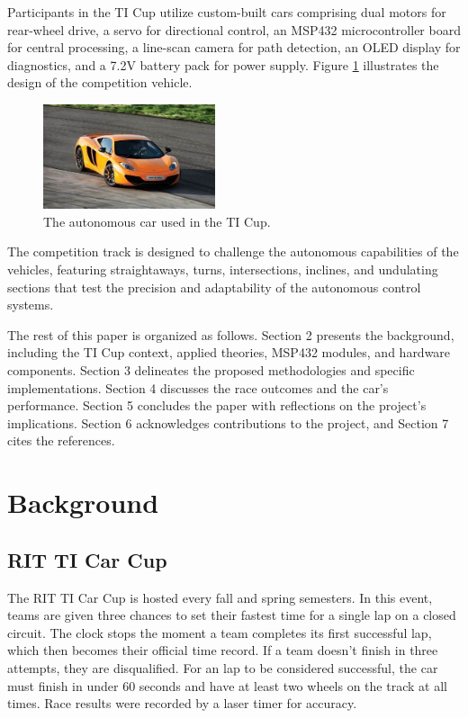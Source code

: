 \documentclass[conference]{IEEEtran}
\begin{document}
Participants in the TI Cup utilize custom-built cars comprising dual motors for rear-wheel drive, a servo for directional control, an MSP432 microcontroller board for central processing, a line-scan camera for path detection, an OLED display for diagnostics, and a 7.2V battery pack for power supply. Figure \ref{fig:car} illustrates the design of the competition vehicle.

\begin{figure}[htbp]
	\centerline{\includegraphics[width=0.45\textwidth]{images/car.jpg}}
	\caption{The autonomous car used in the TI Cup.}
	\label{fig:car}
\end{figure}

The competition track is designed to challenge the autonomous capabilities of the vehicles, featuring straightaways, turns, intersections, inclines, and undulating sections that test the precision and adaptability of the autonomous control systems.

The rest of this paper is organized as follows. Section 2 presents the background, including the TI Cup context, applied theories, MSP432 modules, and hardware components. Section 3 delineates the proposed methodologies and specific implementations. Section 4 discusses the race outcomes and the car's performance. Section 5 concludes the paper with reflections on the project's implications. Section 6 acknowledges contributions to the project, and Section 7 cites the references.

\section{Background}

\subsection{RIT TI Car Cup}

The RIT TI Car Cup is hosted every fall and spring semesters. In this event, teams are given three chances to set their fastest time for a single lap on a closed circuit. The clock stops the moment a team completes its first successful lap, which then becomes their official time record. If a team doesn't finish in three attempts, they are disqualified. For an lap to be considered successful, the car must finish in under 60 seconds and have at least two wheels on the track at all times. Race results were recorded by a laser timer for accuracy.
\end{document}
